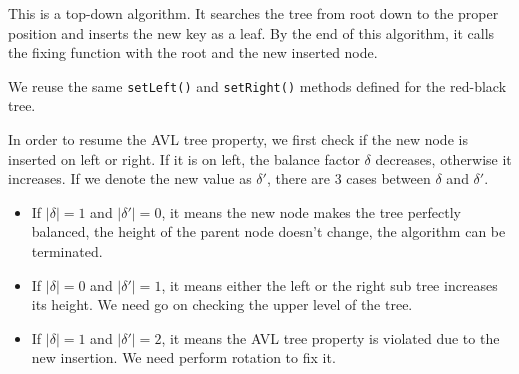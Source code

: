 \documentclass{article}
\begin{document}
This is a top-down algorithm. It searches the tree from root down to the proper
position and inserts the new key as a leaf. By the end of this algorithm, it calls the fixing function with the root and the new inserted node.

We reuse the same \texttt{setLeft()} and \texttt{setRight()} methods defined for the red-black tree.

In order to resume the AVL tree property, we first check if the new node is inserted on left or right. If it is on left, the balance factor $\delta$ decreases, otherwise it increases. If we denote the new value as $\delta'$, there are 3 cases between $\delta$ and $\delta'$.

\begin{itemize}
\item If $|\delta| = 1$ and $|\delta'| = 0$, it means the new node makes the tree perfectly balanced, the height of the parent node doesn't change, the algorithm can be terminated.

\item If $|\delta| = 0$ and $|\delta'| = 1$, it means either the left or the right sub tree increases its height. We need go on checking the upper level of the tree.

\item If $|\delta| = 1$ and $|\delta'| = 2$, it means the AVL tree property is violated due to the new insertion. We need perform rotation to fix it.
\end{itemize}
\end{document}
